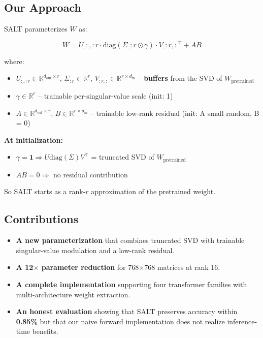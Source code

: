\subsection{Our Approach}

SALT parameterizes $W$ as:

\[
W = U\_{:,:r} \cdot \text{diag}(\Sigma\_{:r} \odot \gamma) \cdot V\_{:r,:}^\top + A B
\tag{1.2}
\]

where:

\begin{itemize}
\item $U_{:,:r} \in \mathbb{R}^{d_\text{out} \times r}$,
  $\Sigma_{:r} \in \mathbb{R}^r$,
  $V_{:r,:} \in \mathbb{R}^{r \times d_\text{in}}$ -- \textbf{buffers} from the SVD of $W_\text{pretrained}$
\item $\gamma \in \mathbb{R}^r$ -- trainable per-singular-value scale (init: 1)
\item $A \in \mathbb{R}^{d_\text{out} \times r}$,
  $B \in \mathbb{R}^{r \times d_\text{in}}$ -- trainable low-rank residual (init: A small random, B = 0)

\end{itemize}
\textbf{At initialization:}
\begin{itemize}
\item $\gamma = \mathbf{1} \Rightarrow U \text{diag}(\Sigma) V^\top$ = truncated SVD of $W_\text{pretrained}$
\item $A B = 0 \Rightarrow$ no residual contribution

\end{itemize}
So SALT starts as a rank-$r$ approximation of the pretrained weight.

\subsection{Contributions}

\begin{itemize}
\item \textbf{A new parameterization} that combines truncated SVD with trainable
  singular-value modulation and a low-rank residual.
\item \textbf{A 12$\times$ parameter reduction} for 768$\times$768 matrices at rank 16.
\item \textbf{A complete implementation} supporting four transformer families with
  multi-architecture weight extraction.
\item \textbf{An honest evaluation} showing that SALT preserves accuracy within
  \textbf{0.85\%} but that our naive forward implementation does not
  realize inference-time benefits.

\end{itemize}
